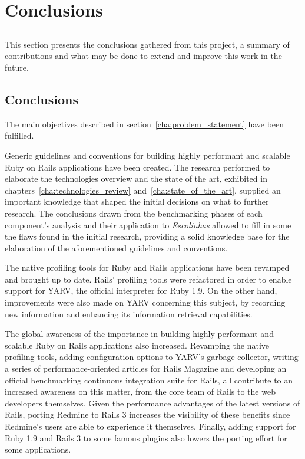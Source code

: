 \chapter{Conclusions} %
\label{cha:conclusions}
\section*{} %
This section presents the conclusions gathered from this project, a summary of contributions and what may be done to extend and improve this work in the future.

\section{Conclusions}
The main objectives described in section~\ref{cha:problem_statement} have been fulfilled.

Generic guidelines and conventions for building highly performant and scalable Ruby on Rails applications have been created. The research performed to elaborate the technologies overview and the state of the art, exhibited in chapters~\ref{cha:technologies_review} and~\ref{cha:state_of_the_art}, supplied an important knowledge that shaped the initial decisions on what to further research. The conclusions drawn from the benchmarking phases of each component's analysis and their application to \textit{Escolinhas} allowed to fill in some the flaws found in the initial research, providing a solid knowledge base for the elaboration of the aforementioned guidelines and conventions.

The native profiling tools for Ruby and Rails applications have been revamped and brought up to date. Rails' profiling tools were refactored in order to enable support for YARV, the official interpreter for Ruby 1.9. On the other hand, improvements were also made on YARV concerning this subject, by recording new information and enhancing its information retrieval capabilities.

The global awareness of the importance in building highly performant and scalable Ruby on Rails applications also increased. Revamping the native profiling tools, adding configuration options to YARV's garbage collector, writing a series of performance-oriented articles for Rails Magazine and developing an official benchmarking continuous integration suite for Rails, all contribute to an increased awareness on this matter, from the core team of Rails to the web developers themselves. Given the performance advantages of the latest versions of Rails, porting Redmine to Rails 3 increases the visibility of these benefits since Redmine's users are able to experience it themselves. Finally, adding support for Ruby 1.9 and Rails 3 to some famous plugins also lowers the porting effort for some applications.

